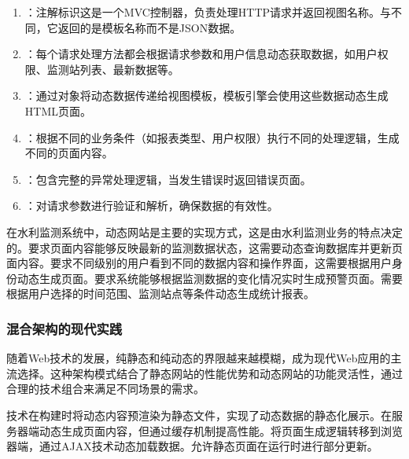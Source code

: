
\begin{enumerate}
\def\labelenumi{\arabic{enumi}.}
\item
  ：注解标识这是一个MVC控制器，负责处理HTTP请求并返回视图名称。与不同，它返回的是模板名称而不是JSON数据。
\item
  ：每个请求处理方法都会根据请求参数和用户信息动态获取数据，如用户权限、监测站列表、最新数据等。
\item
  ：通过对象将动态数据传递给视图模板，模板引擎会使用这些数据动态生成HTML页面。
\item
  ：根据不同的业务条件（如报表类型、用户权限）执行不同的处理逻辑，生成不同的页面内容。
\item
  ：包含完整的异常处理逻辑，当发生错误时返回错误页面。
\item
  ：对请求参数进行验证和解析，确保数据的有效性。
\end{enumerate}

在水利监测系统中，动态网站是主要的实现方式，这是由水利监测业务的特点决定的。要求页面内容能够反映最新的监测数据状态，这需要动态查询数据库并更新页面内容。要求不同级别的用户看到不同的数据内容和操作界面，这需要根据用户身份动态生成页面。要求系统能够根据监测数据的变化情况实时生成预警页面。需要根据用户选择的时间范围、监测站点等条件动态生成统计报表。

\hypertarget{ux6df7ux5408ux67b6ux6784ux7684ux73b0ux4ee3ux5b9eux8df5}{%
\subsubsection{混合架构的现代实践}\label{ux6df7ux5408ux67b6ux6784ux7684ux73b0ux4ee3ux5b9eux8df5}}

随着Web技术的发展，纯静态和纯动态的界限越来越模糊，成为现代Web应用的主流选择。这种架构模式结合了静态网站的性能优势和动态网站的功能灵活性，通过合理的技术组合来满足不同场景的需求。

技术在构建时将动态内容预渲染为静态文件，实现了动态数据的静态化展示。在服务器端动态生成页面内容，但通过缓存机制提高性能。将页面生成逻辑转移到浏览器端，通过AJAX技术动态加载数据。允许静态页面在运行时进行部分更新。

